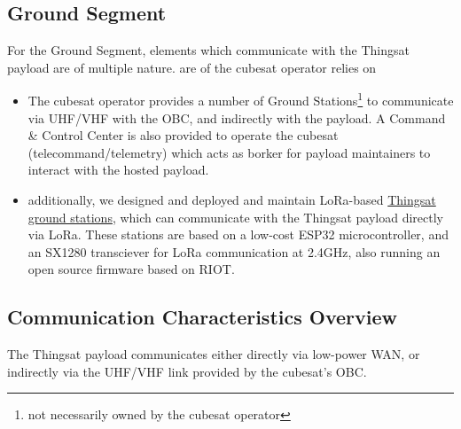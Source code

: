 \subsection*{Ground Segment}
For the Ground Segment, elements which communicate with the Thingsat payload are of multiple nature. are of the cubesat operator relies on 
\begin{itemize}
\item The cubesat operator provides a number of Ground Stations\footnote{not necessarily owned by the cubesat operator} to communicate via UHF/VHF with the OBC, and indirectly with the payload. 
A Command \& Control Center is also provided to operate the cubesat (telecommand/telemetry) which acts as borker for payload maintainers to interact with the hosted payload.
\item additionally, we designed and deployed and maintain LoRa-based  \href{https://github.com/thingsat/tinygs_2g4station}{Thingsat ground stations}, which can communicate with the Thingsat payload directly via LoRa. These stations are based on a low-cost ESP32 microcontroller, and an SX1280 transciever for LoRa communication at 2.4GHz, also running an open source firmware based on RIOT.
\end{itemize}


\subsection{Communication Characteristics Overview}
\label{sec:thingsat-comm-characteristics}

The Thingsat payload communicates either directly via low-power WAN, or indirectly via the UHF/VHF link provided by the cubesat's OBC.

